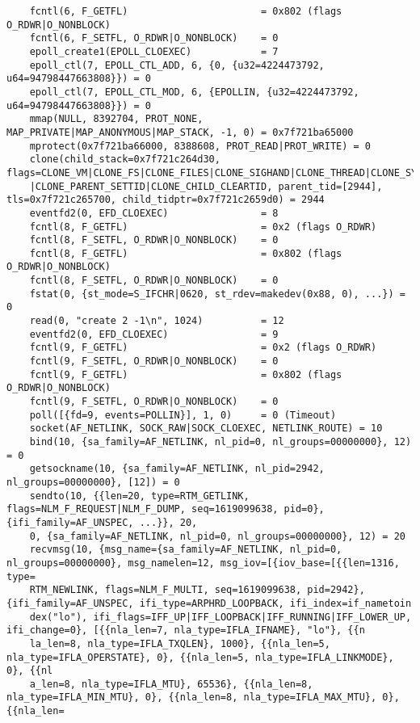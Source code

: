 \documentclass[pdf, unicode, 12pt, a4paper,oneside,fleqn]{article}
\begin{document}
{\begin{verbatim}
    fcntl(6, F_GETFL)                       = 0x802 (flags O_RDWR|O_NONBLOCK)
    fcntl(6, F_SETFL, O_RDWR|O_NONBLOCK)    = 0
    epoll_create1(EPOLL_CLOEXEC)            = 7
    epoll_ctl(7, EPOLL_CTL_ADD, 6, {0, {u32=4224473792, u64=94798447663808}}) = 0
    epoll_ctl(7, EPOLL_CTL_MOD, 6, {EPOLLIN, {u32=4224473792, u64=94798447663808}}) = 0
    mmap(NULL, 8392704, PROT_NONE, MAP_PRIVATE|MAP_ANONYMOUS|MAP_STACK, -1, 0) = 0x7f721ba65000
    mprotect(0x7f721ba66000, 8388608, PROT_READ|PROT_WRITE) = 0
    clone(child_stack=0x7f721c264d30, flags=CLONE_VM|CLONE_FS|CLONE_FILES|CLONE_SIGHAND|CLONE_THREAD|CLONE_SYSVSEM|CLONE_SETTLS
    |CLONE_PARENT_SETTID|CLONE_CHILD_CLEARTID, parent_tid=[2944], tls=0x7f721c265700, child_tidptr=0x7f721c2659d0) = 2944
    eventfd2(0, EFD_CLOEXEC)                = 8
    fcntl(8, F_GETFL)                       = 0x2 (flags O_RDWR)
    fcntl(8, F_SETFL, O_RDWR|O_NONBLOCK)    = 0
    fcntl(8, F_GETFL)                       = 0x802 (flags O_RDWR|O_NONBLOCK)
    fcntl(8, F_SETFL, O_RDWR|O_NONBLOCK)    = 0
    fstat(0, {st_mode=S_IFCHR|0620, st_rdev=makedev(0x88, 0), ...}) = 0
    read(0, "create 2 -1\n", 1024)          = 12
    eventfd2(0, EFD_CLOEXEC)                = 9
    fcntl(9, F_GETFL)                       = 0x2 (flags O_RDWR)
    fcntl(9, F_SETFL, O_RDWR|O_NONBLOCK)    = 0
    fcntl(9, F_GETFL)                       = 0x802 (flags O_RDWR|O_NONBLOCK)
    fcntl(9, F_SETFL, O_RDWR|O_NONBLOCK)    = 0
    poll([{fd=9, events=POLLIN}], 1, 0)     = 0 (Timeout)
    socket(AF_NETLINK, SOCK_RAW|SOCK_CLOEXEC, NETLINK_ROUTE) = 10
    bind(10, {sa_family=AF_NETLINK, nl_pid=0, nl_groups=00000000}, 12) = 0
    getsockname(10, {sa_family=AF_NETLINK, nl_pid=2942, nl_groups=00000000}, [12]) = 0
    sendto(10, {{len=20, type=RTM_GETLINK, flags=NLM_F_REQUEST|NLM_F_DUMP, seq=1619099638, pid=0}, {ifi_family=AF_UNSPEC, ...}}, 20, 
    0, {sa_family=AF_NETLINK, nl_pid=0, nl_groups=00000000}, 12) = 20
    recvmsg(10, {msg_name={sa_family=AF_NETLINK, nl_pid=0, nl_groups=00000000}, msg_namelen=12, msg_iov=[{iov_base=[{{len=1316, type=
    RTM_NEWLINK, flags=NLM_F_MULTI, seq=1619099638, pid=2942}, {ifi_family=AF_UNSPEC, ifi_type=ARPHRD_LOOPBACK, ifi_index=if_nametoin
    dex("lo"), ifi_flags=IFF_UP|IFF_LOOPBACK|IFF_RUNNING|IFF_LOWER_UP, ifi_change=0}, [{{nla_len=7, nla_type=IFLA_IFNAME}, "lo"}, {{n
    la_len=8, nla_type=IFLA_TXQLEN}, 1000}, {{nla_len=5, nla_type=IFLA_OPERSTATE}, 0}, {{nla_len=5, nla_type=IFLA_LINKMODE}, 0}, {{nl
    a_len=8, nla_type=IFLA_MTU}, 65536}, {{nla_len=8, nla_type=IFLA_MIN_MTU}, 0}, {{nla_len=8, nla_type=IFLA_MAX_MTU}, 0}, {{nla_len=

\end{verbatim}}
\end{document}
